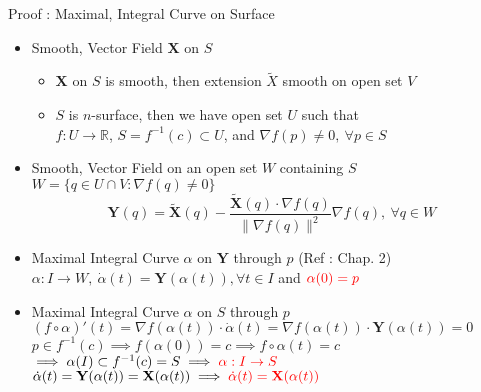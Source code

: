 \documentclass{beamer}
\begin{document}
\begin{frame}{Proof : Maximal, Integral Curve on Surface}
\begin{itemize}
	\item Smooth, Vector Field $\mathbf{X}$ on $S$
	\begin{itemize}
		\item $\mathbf{X}$ on $S$ is smooth, then extension $\tilde{X}$ smooth on open set $V$
		\item $S$ is $n$-surface, then we have open set $U$ such that\\
			$f : U \to \mathbb{R}$, $S = f^{-1}(c) \subset U$, and $\nabla f(p) \ne 0,\ \forall p \in S$
	\end{itemize}
	\item Smooth, Vector Field on an open set $W$ containing $S$\\
		$ W = \{ q \in U \cap V : \nabla f(q) \ne 0 \} $
		$$ \mathbf{Y}(q) = \tilde{\mathbf{X}}(q) -\frac{\tilde{\mathbf{X}}(q) \cdot \nabla f(q)}{\|\nabla f(q)\|^2}\nabla f(q),\ \forall q \in W $$
	\item Maximal Integral Curve $\alpha$ on $\mathbf{Y}$ through $p$ (Ref : Chap. 2)\\
		$\alpha : I \to W,\ \dot{\alpha}(t) = \mathbf{Y}(\alpha(t)),\forall t \in I$ and ${\color{red}\alpha(0) = p}$
	\item Maximal Integral Curve $\alpha$ on $S$ through $p$\\
		$ (f \circ \alpha)'(t) = \nabla f(\alpha(t)) \cdot \dot{\alpha}(t) = \nabla f(\alpha(t)) \cdot \mathbf{Y}(\alpha(t)) = 0 $ \\
		$p \in f^{-1}(c) \implies f(\alpha(0)) = c \implies f \circ \alpha(t) = c$\\
		$\implies \alpha(I) \subset f^{-1}(c) = S \implies {\color{red}\alpha : I \to S}$\\
		$\dot{\alpha}(t) = \mathbf{Y}(\alpha(t)) = \mathbf{X}(\alpha(t)) \implies {\color{red} \dot{\alpha}(t) = \mathbf{X}(\alpha(t))}$
\end{itemize}
\end{frame}
\end{document}

